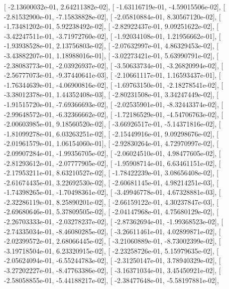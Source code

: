\documentclass{article}
\begin{document}
       [ -2.13600032e-01,   2.64211382e-02],
       [ -1.63116719e-01,  -4.59015506e-02],
       [ -2.81532900e-01,  -7.15838828e-02],
       [ -2.05810884e-01,   8.30567120e-02],
       [ -1.73481202e-01,   5.92238492e-02],
       [ -2.82922437e-01,   9.09251622e-02],
       [ -3.42247511e-01,  -3.71972760e-02],
       [ -1.92034108e-01,   1.21956662e-01],
       [ -1.93938528e-01,   2.13756803e-02],
       [ -2.07632997e-01,   4.86329453e-02],
       [ -3.43882207e-01,   1.18988016e-01],
       [ -3.02273421e-01,   5.63990791e-02],
       [ -2.38083773e-01,  -2.03926937e-02],
       [ -3.50633734e-01,  -3.26820994e-02],
       [ -2.56777073e-01,  -9.37440641e-03],
       [ -2.10661117e-01,   1.16593437e-01],
       [ -1.76344639e-01,  -4.06900816e-02],
       [ -1.69763150e-01,  -2.18278541e-02],
       [ -3.38012378e-01,   1.44352408e-03],
       [ -2.80231508e-01,   3.34247449e-02],
       [ -1.91515720e-01,  -7.69366693e-02],
       [ -2.02535901e-01,  -8.32443374e-02],
       [ -2.99648572e-01,  -6.32366662e-02],
       [ -1.72186529e-01,  -4.54706763e-02],
       [ -2.00603985e-01,   9.18560520e-02],
       [ -3.66926517e-01,  -5.14371816e-02],
       [ -1.81099278e-01,   6.03263251e-02],
       [ -2.15449916e-01,   9.09298676e-02],
       [ -2.01961579e-01,   1.06154060e-01],
       [ -2.92830264e-01,   4.72970997e-02],
       [ -2.09907284e-01,  -1.99356705e-02],
       [ -2.06024510e-01,   4.98477605e-02],
       [ -2.81293612e-01,  -2.07777905e-02],
       [ -1.95908714e-01,   6.63461151e-02],
       [ -2.17953211e-01,   8.63210527e-02],
       [ -1.78422239e-01,   3.08656408e-02],
       [ -2.61674435e-01,   3.22692530e-02],
       [ -2.60681145e-01,   4.98214251e-03],
       [ -1.74398265e-01,  -1.70498361e-02],
       [ -3.49946778e-01,   4.67328881e-03],
       [ -2.32286119e-01,   8.25890201e-02],
       [ -2.66159122e-01,   4.30237847e-03],
       [ -2.69680646e-01,   5.37809505e-02],
       [ -2.04147968e-01,   4.75680129e-02],
       [ -2.26703333e-01,  -2.03278237e-02],
       [ -2.87362694e-01,  -1.99368523e-02],
       [ -2.74335034e-01,  -8.46080285e-02],
       [ -3.26611461e-01,   4.02899871e-02],
       [ -2.02399572e-01,   2.68066445e-02],
       [ -3.21060889e-01,  -8.73002399e-02],
       [ -3.19718504e-01,   6.23320915e-02],
       [ -2.23258726e-01,   5.15979635e-02],
       [ -2.05624094e-01,  -6.55244783e-02],
       [ -2.31250147e-01,   3.78940329e-02],
       [ -3.27202227e-01,  -8.47763386e-02],
       [ -3.16371034e-01,   3.45450921e-02],
       [ -2.58058855e-01,  -5.44188217e-02],
       [ -2.38477648e-01,  -5.58197881e-02],
\end{document}
